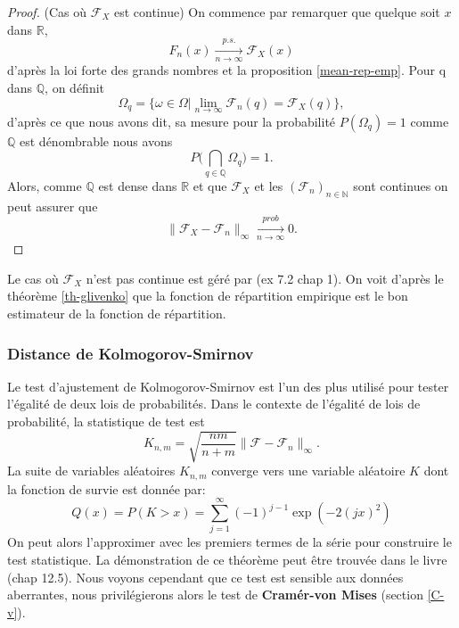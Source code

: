\documentclass[a4paper,10pt]{article}
\begin{document}
	\begin{proof} (Cas où $\mathcal{F}_X$ est continue)
		On commence par remarquer que quelque soit $x$ dans $\mathbb{R}$, \[F_{n}(x)\xrightarrow[n\to \infty]{p.s.}\mathcal{F}_X(x)\] d'après la loi forte des grands nombres et la proposition \eqref{mean-rep-emp}. Pour q dans $\mathbb{Q}$, on définit 
		\[\Omega_{q}=\{\omega \in \Omega | \lim_{n \to \infty} \mathcal{F}_{n}(q)=\mathcal{F}_X(q)\},\]
		d'après ce que nous avons dit, sa mesure pour la probabilité $P(\Omega_q)=1$ comme $\mathbb{Q}$ est dénombrable nous avons  
		\[P\Big(\bigcap_{q \in \mathbb{Q}} \Omega_q \Big)=1.\]
		Alors, comme $\mathbb{Q}$ est dense dans $\mathbb{R}$ et que $\mathcal{F}_{X}$ et les $(\mathcal{F}_n)_{n \in \mathbb{N}}$ sont continues on peut assurer que   
		\[	\|\mathcal{F}_{X}-\mathcal{F}_{n}\|_{\infty} \xrightarrow[n\to \infty]{prob} 0. \]
	\end{proof}
	Le cas où $\mathcal{F}_{X}$ n'est pas continue est géré par \cite{durrett2019probability} (ex 7.2 chap 1). On voit d'après le théorème \ref{th-glivenko} que la fonction de répartition empirique est le bon estimateur de la fonction de répartition. 
	\subsubsection{Distance de Kolmogorov-Smirnov}
	
	Le test d'ajustement  de  Kolmogorov-Smirnov est  l'un des plus  utilisé pour tester l'égalité de deux lois  de probabilités. Dans  le  contexte de  l'égalité de lois  de probabilité, la statistique  de  test  est 
	\[K_{n,m}= \sqrt{\frac{nm}{n+m}}\|\mathcal{F}-\mathcal{F}_n\|_{\infty}.\]
	La suite de variables aléatoires $K_{n,m}$ converge vers une variable aléatoire $K$ dont la fonction de survie est donnée par: 
	\begin{equation}
		Q(x)=P(K>x)=\sum_{j=1}^{\infty}(-1)^{j-1}\exp(-2(jx)^2)
	\end{equation}
	On peut alors l'approximer avec les premiers termes de la série pour construire le test statistique. La démonstration de ce théorème peut être trouvée dans le livre \cite{walker1965probability}(chap 12.5). Nous voyons cependant que ce test est sensible aux données aberrantes, nous privilégierons alors le test de \textbf{Cramér-von Mises} (section \ref{C-v}).
	
	
\end{document}
